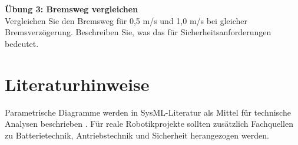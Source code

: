 \begin{uebungbox}
\textbf{Übung 3: Bremsweg vergleichen}\\
Vergleichen Sie den Bremsweg für 0,5 m/s und 1,0 m/s bei gleicher Bremsverzögerung. Beschreiben Sie, was das für Sicherheitsanforderungen bedeutet.
\end{uebungbox}

\section{Literaturhinweise}
Parametrische Diagramme werden in SysML-Literatur als Mittel für technische Analysen beschrieben \cite{friedenthal2014}. Für reale Robotikprojekte sollten zusätzlich Fachquellen zu Batterietechnik, Antriebstechnik und Sicherheit herangezogen werden.
